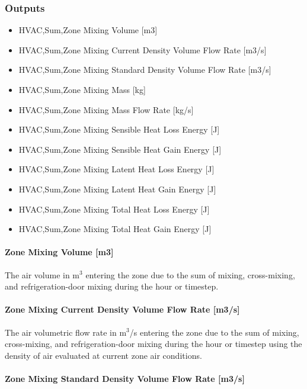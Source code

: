 \subsubsection{Outputs}\label{outputs-4-000}

\begin{itemize}
\item
  HVAC,Sum,Zone Mixing Volume {[}m3{]}
\item
  HVAC,Sum,Zone Mixing Current Density Volume Flow Rate {[}m3/s{]}
\item
  HVAC,Sum,Zone Mixing Standard Density Volume Flow Rate {[}m3/s{]}
\item
  HVAC,Sum,Zone Mixing Mass {[}kg{]}
\item
  HVAC,Sum,Zone Mixing Mass Flow Rate {[}kg/s{]}
\item
  HVAC,Sum,Zone Mixing Sensible Heat Loss Energy {[}J{]}
\item
  HVAC,Sum,Zone Mixing Sensible Heat Gain Energy {[}J{]}
\item
  HVAC,Sum,Zone Mixing Latent Heat Loss Energy {[}J{]}
\item
  HVAC,Sum,Zone Mixing Latent Heat Gain Energy {[}J{]}
\item
  HVAC,Sum,Zone Mixing Total Heat Loss Energy {[}J{]}
\item
  HVAC,Sum,Zone Mixing Total Heat Gain Energy {[}J{]}
\end{itemize}

\paragraph{Zone Mixing Volume {[}m3{]}}\label{zone-mixing-volume-m3-1}

The air volume in m\(^{3}\) entering the zone due to the sum of mixing, cross-mixing, and refrigeration-door mixing during the hour or timestep.

\paragraph{Zone Mixing Current Density Volume Flow Rate {[}m3/s{]}}\label{zone-mixing-current-density-volumetric-flow-rate-m3s-1}

The air volumetric flow rate in m\(^{3}\)/s entering the zone due to the sum of mixing, cross-mixing, and refrigeration-door mixing during the hour or timestep using the density of air evaluated at current zone air conditions.

\paragraph{Zone Mixing Standard Density Volume Flow Rate {[}m3/s{]}}\label{zone-mixing-standard-density-volumetric-flow-rate-m3s-1}

